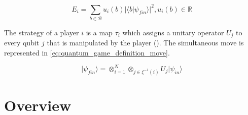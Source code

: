 \begin{equation}
E_{i}=\sum_{b \in \mathcal{B}} u_{i}(b)\vert \langle b\vert \psi_{fin}\rangle\vert^{2}, u_{i}(b) \in \mathbb{R}
\label{eq:quantum_game_definition_payoff_func}
\end{equation}

The strategy of a player $i$ is a map $\tau_{i}$ which assigns a
unitary operator $U_{j}$ to every qubit $j$ that is manipulated
by the player ().
The simultaneous move is represented in \ref{eq:quantum_game_definition_move}.

\begin{equation}
\vert\psi_{fin}\rangle=\otimes_{i=1}^{N}\otimes_{j\in\xi^{-1}(i)}U_{j}\vert\psi_{in}\rangle\label{eq:quantum_game_definition_move}
\end{equation}

\section{Overview}
\label{sec:background_overview}

